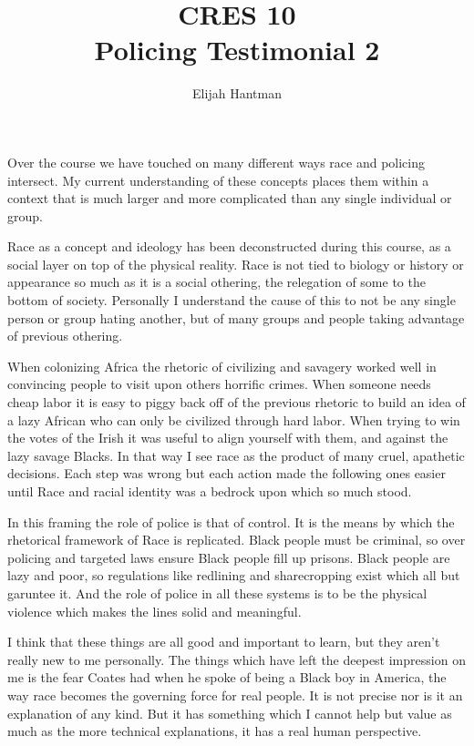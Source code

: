 \documentclass{report}
\title{\Huge{CRES 10}\\Policing Testimonial 2}
\author{\huge{Elijah Hantman}}
\date{}
\begin{document}
\maketitle
\newpage

Over the course we have touched on many different ways
race and policing intersect. My current understanding of
these concepts places them within a context that is much
larger and more complicated than any single individual or
group.

Race as a concept and ideology has been deconstructed
during this course, as a social layer on top of the physical
reality. Race is not tied to biology or history or appearance
so much as it is a social othering, the relegation of some to
the bottom of society. Personally I understand the cause of 
this to not be any single person or group hating another, but
of many groups and people taking advantage of previous
othering.

When colonizing Africa the rhetoric of civilizing and savagery
worked well in convincing people to visit upon others horrific
crimes. When someone needs cheap labor it is easy to piggy back
off of the previous rhetoric to build an idea of a lazy
African who can only be civilized through hard labor. When trying
to win the votes of the Irish it was useful to align yourself
with them, and against the lazy savage Blacks. In that way I
see race as the product of many cruel, apathetic decisions.
Each step was wrong but each action made the following ones
easier until Race and racial identity was a bedrock upon which
so much stood. 

In this framing the role of police is that of control. It is the
means by which the rhetorical framework of Race is replicated.
Black people must be criminal, so over policing and targeted
laws ensure Black people fill up prisons. Black people are
lazy and poor, so regulations like redlining and sharecropping
exist which all but garuntee it. And the role of police in
all these systems is to be the physical violence which makes
the lines solid and meaningful.

I think that these things are all good and important to learn,
but they aren't really new to me personally. The things which
have left the deepest impression on me is the fear Coates had
when he spoke of being a Black boy in America, the way
race becomes the governing force for real people. It is not
precise nor is it an explanation of any kind. But it has something
which I cannot help but value as much as the more technical
explanations, it has a real human perspective.
\end{document}
